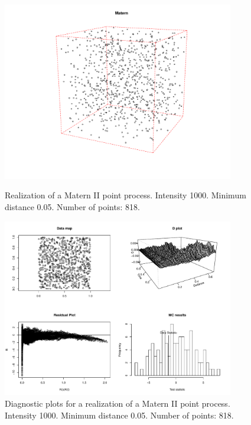 \documentclass{article}
\begin{document}
\begin{figure}[p]
  \centering
    \includegraphics[width=0.9\textwidth]{PP_Matern_II_1000_0p05_818.pdf}
  \caption{Realization of a Matern II point process. Intensity 1000. Minimum distance 0.05. Number of points: 818.}
  \label{fig:maternPP}

\vspace*{\floatsep}

    \includegraphics[width=0.9\textwidth]{diag_Matern_II_1000_0p05_818.pdf}
  \caption{Diagnostic plots for a realization of a Matern II point process.  Intensity 1000. Minimum distance 0.05. Number of points: 818.}
  \label{fig:maternDiag}
\end{figure}
\end{document}
